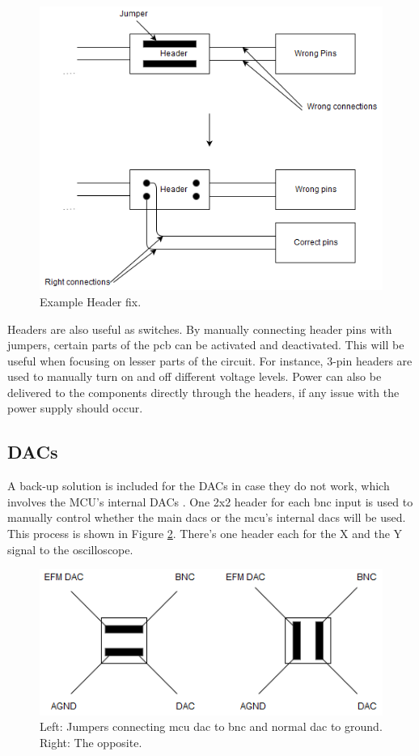 \begin{figure}[h!]
\centering
\includegraphics[scale = 0.57]{images/Header_fix.png}
\caption{Example Header fix.}
\label{fig:Header fix}
\end{figure}

Headers are also useful as switches.
By manually connecting header pins with jumpers, certain parts of the \gls{pcb} can be activated and deactivated.
This will be useful when focusing on lesser parts of the circuit.
For instance, 3-pin headers are used to manually turn on and off different voltage levels.
Power can also be delivered to the components directly through the headers, if any issue with the power supply should occur.

\subsection{DACs}
A back-up solution is included for the DACs in case they do not work, which involves the MCU's internal DACs \cite[ch. 29]{efm32referencemanual}.
One 2x2 header for each \gls{bnc} input is used to manually control whether the main \gls{dac}s or the \gls{mcu}'s internal \gls{dac}s will be used.
This process is shown in Figure \ref{fig:DAC headers}.
There's one header each for the X and the Y signal to the oscilloscope.

\begin{figure}[h!]
\centering
\includegraphics[scale = 0.6]{images/DAC_headers.png}
\caption{Left: Jumpers connecting \gls{mcu} \gls{dac} to \gls{bnc} and normal \gls{dac} to ground. Right: The opposite.}
\label{fig:DAC headers}
\end{figure}

